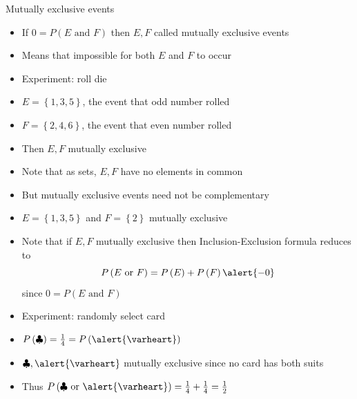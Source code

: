 \documentclass{beamer}
\theoremstyle{definition}
\begin{document}
\begin{frame}{Mutually exclusive events}
\begin{itemize}
\item If $0=P\left(\text{$E$ and $F$}\right)$
then $E,F$ called \alert{mutually exclusive events}
\item Means that impossible for \alert{both} $E$ and $F$ to occur
\end{itemize}
\begin{example}
\begin{itemize}
\item Experiment: roll die
\item $E=\left\{1,3,5\right\}$, the event
that odd number rolled
\item $F=\left\{2,4,6\right\}$, the event
that even number rolled
\item Then $E,F$ mutually exclusive
\item Note that as sets, $E,F$ have \alert{no elements} in common
\end{itemize}
\end{example}
\begin{example}
\begin{itemize}
\item But mutually exclusive events need not be \alert{complementary}
\item $E=\left\{1,3,5\right\}$ and $F=\left\{2\right\}$
mutually exclusive
\end{itemize}
\end{example}
\end{frame}

\begin{frame}
\begin{itemize}
\item Note that if $E,F$ mutually exclusive then Inclusion-Exclusion
formula reduces to
\[P\left(\text{$E$ or $F$}\right)=P\left(E\right)
+P\left(F\right)\alert{-0}\]
since $0=P\left(\text{$E$ and $F$}\right)$
\end{itemize}
\begin{example}
\begin{itemize}
\item Experiment: randomly select card
\item $P\left(\clubsuit\right)=\frac{1}{4}=P\left(\alert{\varheart}\right)$
\item $\clubsuit,\alert{\varheart}$ mutually exclusive
since no card has \alert{both} suits
\item Thus $P\left(\text{$\clubsuit$ or $\alert{\varheart}$}\right)
=\frac{1}{4}+\frac{1}{4}=\frac{1}{2}$
\end{itemize}
\end{example}
\end{frame}
\end{document}
